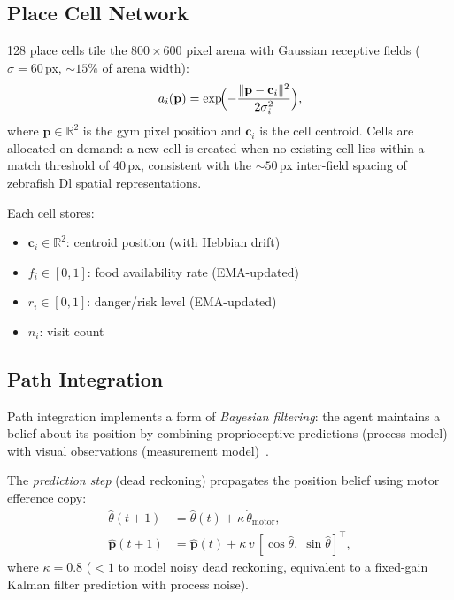 \documentclass[11pt,a4paper]{article}
\begin{document}
\subsection{Place Cell Network}

128 place cells tile the $800\times 600$ pixel arena with Gaussian receptive
fields ($\sigma = 60$\,px, ${\sim}15\%$ of arena width):
\begin{equation}\label{eq:place_cell}
  a_i(\mathbf{p}) = \exp\!\Bigl(-\frac{\|\mathbf{p} - \mathbf{c}_i\|^2}{2\sigma_i^2}\Bigr),
\end{equation}
where $\mathbf{p} \in \mathbb{R}^2$ is the gym pixel position and
$\mathbf{c}_i$ is the cell centroid.  Cells are allocated on demand: a new
cell is created when no existing cell lies within a match threshold of
$40$\,px, consistent with the ${\sim}50$\,px inter-field spacing of zebrafish
Dl spatial representations.

Each cell stores:
\begin{itemize}[nosep]
  \item $\mathbf{c}_i \in \mathbb{R}^2$: centroid position (with Hebbian drift)
  \item $f_i \in [0,1]$: food availability rate (EMA-updated)
  \item $r_i \in [0,1]$: danger/risk level (EMA-updated)
  \item $n_i$: visit count
\end{itemize}

\subsection{Path Integration}

Path integration implements a form of \emph{Bayesian filtering}: the agent
maintains a belief about its position by combining proprioceptive
predictions (process model) with visual observations (measurement
model)~\cite{mcnaughton2006,etienne2004}.

The \emph{prediction step} (dead reckoning) propagates the position belief
using motor efference copy:
\begin{equation}\label{eq:path_integration}
\begin{aligned}
  \hat{\theta}(t{+}1) &= \hat{\theta}(t) + \kappa\,\dot{\theta}_\text{motor}, \\
  \hat{\mathbf{p}}(t{+}1) &= \hat{\mathbf{p}}(t)
    + \kappa\,v\,[\cos\hat{\theta},\;\sin\hat{\theta}]^\top,
\end{aligned}
\end{equation}
where $\kappa = 0.8$ ($<1$ to model noisy dead reckoning, equivalent to
a fixed-gain Kalman filter prediction with process noise).
\end{document}
